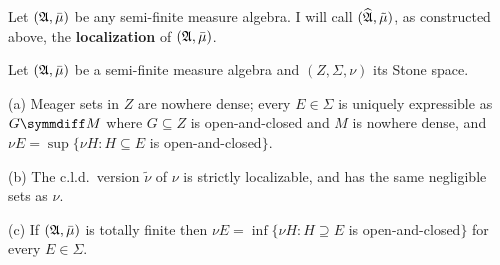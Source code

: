  Let
$(\frak A,\bar\mu)$ be any semi-finite
measure algebra.   I will call $(\widehat{\frak A},\tilde\mu)$, as
constructed
above, the {\bf localization} of $(\frak A,\bar\mu)$.   

 Let
$(\frak A,\bar\mu)$ be a semi-finite measure algebra and
$(Z,\Sigma,\nu)$ its Stone space.

(a) Meager sets in $Z$ are nowhere dense;  every $E\in\Sigma$ is
uniquely expressible as $G\symmdiff M$ where $G\subseteq Z$ is
open-and-closed and $M$ is nowhere dense, and
$\nu E=\sup\{\nu H:H\subseteq E$ is open-and-closed$\}$.

(b) The c.l.d.\ version $\tilde\nu$ of $\nu$ is strictly localizable,
and has the same negligible sets as $\nu$.

(c) If $(\frak A,\bar\mu)$ is totally finite then
$\nu E=\inf\{\nu H:H\supseteq E$ is open-and-closed$\}$ for every
$E\in\Sigma$.

